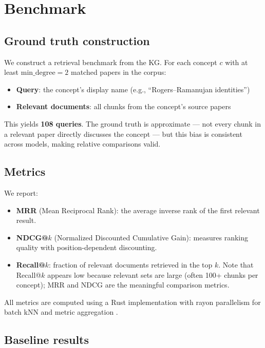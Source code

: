 \documentclass[11pt,a4paper]{article}
\begin{document}
\section{Benchmark}
\label{sec:benchmark}

\subsection{Ground truth construction}

We construct a retrieval benchmark from the KG. For each concept $c$ with at
least $\text{min\_degree} = 2$ matched papers in the corpus:
\begin{itemize}[nosep]
    \item \textbf{Query}: the concept's display name (e.g., ``Rogers--Ramanujan
          identities'')
    \item \textbf{Relevant documents}: all chunks from the concept's source
          papers
\end{itemize}

This yields \textbf{108 queries}. The ground truth is approximate --- not
every chunk in a relevant paper directly discusses the concept --- but this
bias is consistent across models, making relative comparisons valid.

\subsection{Metrics}

We report:
\begin{itemize}[nosep]
    \item \textbf{MRR} (Mean Reciprocal Rank): the average inverse rank of the
          first relevant result.
    \item \textbf{NDCG@$k$} (Normalized Discounted Cumulative Gain): measures
          ranking quality with position-dependent discounting.
    \item \textbf{Recall@$k$}: fraction of relevant documents retrieved in the
          top $k$. Note that Recall@$k$ appears low because relevant sets are
          large (often 100+ chunks per concept); MRR and NDCG are the
          meaningful comparison metrics.
\end{itemize}

All metrics are computed using a Rust implementation with rayon parallelism
for batch kNN and metric aggregation \cite{rust-metrics}.

\subsection{Baseline results}
\end{document}
